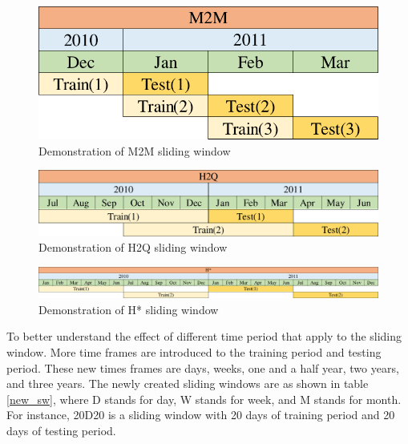 \documentclass[../Proposed Method.tex]{subfiles}
\begin{document}
\begin{figure}[H]
    \centering
    \includegraphics[scale = 0.5] {figure/M2M.pdf}
    \caption{Demonstration of M2M sliding window}
    \label{M2M}
\end{figure}

\begin{figure}[H]
    \centering
    \includegraphics[scale = 0.5] {figure/H2Q.pdf}
    \caption{Demonstration of H2Q sliding window}
    \label{H2Q}
\end{figure}

\begin{figure}[H]
    \centering
    \includegraphics[scale = 0.5] {figure/H_star.pdf}
    \caption{Demonstration of H* sliding window}
    \label{H_star}
\end{figure}

To better understand the effect of different time period that apply to the sliding window. More time frames are introduced to the training period and testing period. These new times frames are days, weeks, one and a half year, two years, and three years. The newly created sliding windows are as shown in table \ref{new_sw}, where D stands for day, W stands for week, and M stands for month. For instance, 20D20 is a sliding window with 20 days of training period and 20 days of testing period.
\end{document}
